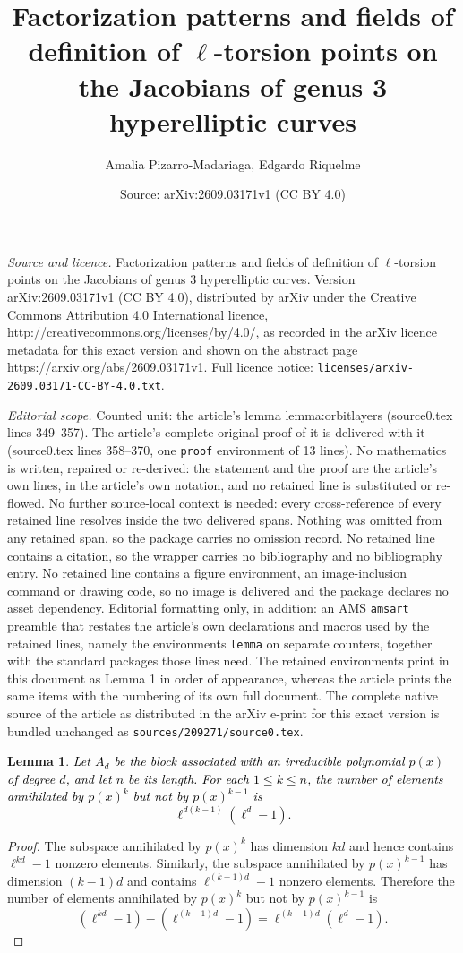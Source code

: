 \documentclass[10pt,a4paper]{amsart}
\title{Factorization patterns and fields of definition of $\ell$-torsion points on the Jacobians of genus 3 hyperelliptic curves}
\author{Amalia Pizarro-Madariaga, Edgardo Riquelme}
\date{Source: arXiv:2609.03171v1 (CC BY 4.0)}
\newtheorem{lemma}{Lemma}
\newcommand{\azul}[1]{\textcolor{black}{#1}}
\begin{document}
\maketitle

\noindent\emph{Source and licence.} Factorization patterns and fields of definition of $\ell$-torsion points on the Jacobians of genus 3 hyperelliptic curves. Version arXiv:2609.03171v1 (CC BY 4.0), distributed by arXiv under the Creative Commons Attribution 4.0 International licence, http://creativecommons.org/licenses/by/4.0/, as recorded in the arXiv licence metadata for this exact version and shown on the abstract page https://arxiv.org/abs/2609.03171v1. Full licence notice: \texttt{licenses/arxiv-2609.03171-CC-BY-4.0.txt}.\par\smallskip

\noindent\textit{Editorial scope.} Counted unit: the article's lemma lemma:orbitlayers (source0.tex lines 349--357). The article's complete original proof of it is delivered with it (source0.tex lines 358--370, one \texttt{proof} environment of 13 lines). No mathematics is written, repaired or re-derived: the statement and the proof are the article's own lines, in the article's own notation, and no retained line is substituted or re-flowed.  No further source-local context is needed: every cross-reference of every retained line resolves inside the two delivered spans.  Nothing was omitted from any retained span, so the package carries no omission record.  No retained line contains a citation, so the wrapper carries no bibliography and no bibliography entry.  No retained line contains a figure environment, an image-inclusion command or drawing code, so no image is delivered and the package declares no asset dependency.  Editorial formatting only, in addition: an AMS \texttt{amsart} preamble that restates the article's own declarations and macros used by the retained lines, namely the environments \texttt{lemma} on separate counters, together with the standard packages those lines need.  The retained environments print in this document as Lemma 1 in order of appearance, whereas the article prints the same items with the numbering of its own full document.  The complete native source of the article as distributed in the arXiv e-print for this exact version is bundled unchanged as \texttt{sources/209271/source0.tex}.
\begin{lemma}\label{lemma:orbitlayers}
\azul{Let $A_d$ be the block associated with an irreducible polynomial
$p(x)$ of degree $d$, and let $n$ be its length.
For each $1\le k\le n$, the number of elements annihilated by
$p(x)^k$ but not by $p(x)^{k-1}$ is
\[
\ell^{d(k-1)}(\ell^d-1).
\]}
\end{lemma}

\begin{proof}
The subspace annihilated by $p(x)^k$ has dimension $kd$ and hence
contains $\ell^{kd}-1$ nonzero elements.
Similarly, the subspace annihilated by $p(x)^{k-1}$ has dimension
$(k-1)d$ and contains $\ell^{(k-1)d}-1$ nonzero elements.
Therefore the number of elements annihilated by $p(x)^k$ but not by
$p(x)^{k-1}$ is
\[
(\ell^{kd}-1)-(\ell^{(k-1)d}-1)
=
\ell^{(k-1)d}(\ell^d-1).
\]
\end{proof}
\end{document}
